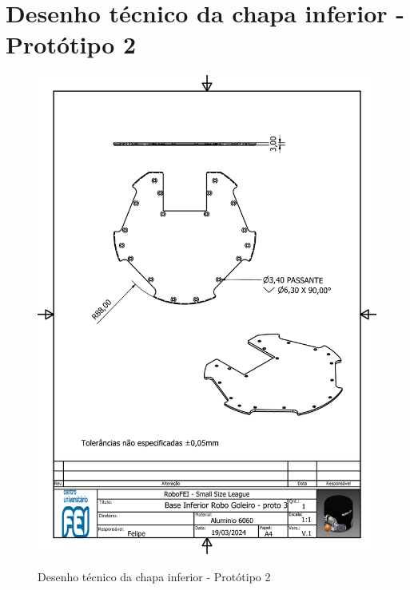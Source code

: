 \documentclass[deposito, acronym, symbols]{fei}
\begin{document}
\chapter{Desenho técnico da chapa inferior - Protótipo 2}
\begin{figure}[!htb]
   \centering
   \caption{Desenho técnico da chapa inferior - Protótipo 2}
    \includegraphics[scale=0.7]{Imagens/chapa inferior - Goleiro proto 3.pdf}
    \label{fig:chapa inferior-proto3}
\end{figure}
\end{document}
